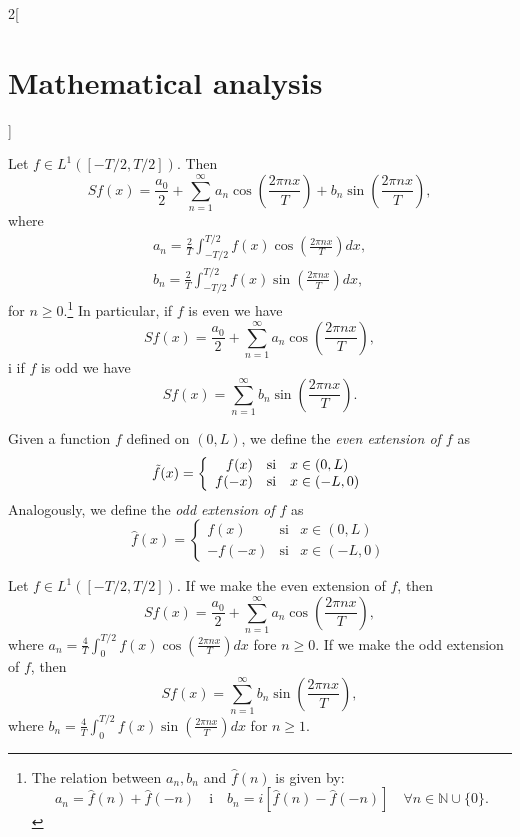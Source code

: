 \documentclass[class=article,crop=false]{standalone}
\begin{document}
\begin{multicols}{2}[\section{Mathematical analysis}]
\begin{prop}
Let $f\in L^1([-T/2,T/2])$. Then $$Sf(x)=\frac{a_0}{2}+\sum_{n=1}^\infty a_n\cos\left(\frac{2\pi nx}{T}\right)+b_n\sin\left(\frac{2\pi nx}{T}\right),$$ where \begin{gather*}
    a_n=\frac{2}{T}\int_{-T/2}^{T/2}f(x)\cos\left(\frac{2\pi nx}{T}\right)dx,\\ b_n=\frac{2}{T}\int_{-T/2}^{T/2}f(x)\sin\left(\frac{2\pi nx}{T}\right)dx,
\end{gather*} for $n\geq 0.$\footnote{The relation between $a_n,b_n$ and $\widehat{f}(n)$ is given by: $$a_n=\widehat{f}(n)+\widehat{f}(-n)\quad \text{i}\quad b_n=i\left[\widehat{f}(n)-\widehat{f}(-n)\right]\quad\forall n\in\mathbb{N}\cup\{0\}.$$} In particular, if $f$ is even we have $$Sf(x)=\frac{a_0}{2}+\sum_{n=1}^\infty a_n\cos\left(\frac{2\pi nx}{T}\right),$$i if $f$ is odd we have $$Sf(x)=\sum_{n=1}^\infty b_n\sin\left(\frac{2\pi nx}{T}\right).$$ 
\end{prop}
\begin{definition}
Given a function $f$ defined on $(0,L)$, we define the \textit{even extension of $f$} as $$\Tilde{f}(x)=\left\{
    \begin{array}{rcl}
    f(x) & \text{si} & x\in(0,L) \\
    f(-x) & \text{si} & x\in(-L,0)
    \end{array}\right.$$ Analogously, we define the \textit{odd extension of $f$} as $$\hat{f}(x)=\left\{
    \begin{array}{rcl}
    f(x) & \text{si} & x\in(0,L) \\
    -f(-x) & \text{si} & x\in(-L,0)
    \end{array}\right.$$
\end{definition}
\begin{prop}
Let $f\in L^1([-T/2,T/2])$. If we make the even extension of $f$, then $$Sf(x)=\frac{a_0}{2}+\sum_{n=1}^\infty a_n\cos\left(\frac{2\pi nx}{T}\right),$$ where $\displaystyle a_n=\frac{4}{T}\int_0^{T/2}f(x)\cos\left(\frac{2\pi nx}{T}\right)dx$ fore $n\geq 0$. If we make the odd extension of $f$, then $$Sf(x)=\sum_{n=1}^\infty b_n\sin\left(\frac{2\pi nx}{T}\right),$$ where $\displaystyle b_n=\frac{4}{T}\int_0^{T/2}f(x)\sin\left(\frac{2\pi nx}{T}\right)dx$ for $n\geq 1$.
\end{prop}

\end{multicols}
\end{document}
